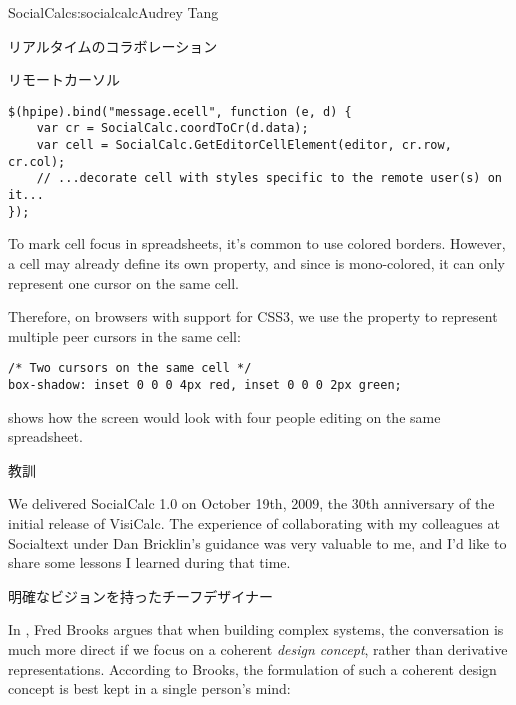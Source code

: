 \begin{aosachapter}{SocialCalc}{s:socialcalc}{Audrey Tang}
\begin{aosasect1}{リアルタイムのコラボレーション}
\begin{aosasect2}{リモートカーソル}
\begin{verbatim}
$(hpipe).bind("message.ecell", function (e, d) {
    var cr = SocialCalc.coordToCr(d.data);
    var cell = SocialCalc.GetEditorCellElement(editor, cr.row, cr.col);
    // ...decorate cell with styles specific to the remote user(s) on it...
});
\end{verbatim}

To mark cell focus in spreadsheets, it's common to use colored
borders.  However, a cell may already define its own 
property, and since  is mono-colored, it can only
represent one cursor on the same cell.

Therefore, on browsers with support for CSS3, we use the 
property to represent multiple peer cursors in the same cell:

\begin{verbatim}
/* Two cursors on the same cell */
box-shadow: inset 0 0 0 4px red, inset 0 0 0 2px green;
\end{verbatim}

 shows how the screen would look with four
people editing on the same spreadsheet.


\end{aosasect2}

\end{aosasect1}

\begin{aosasect1}{教訓}

We delivered SocialCalc 1.0 on October 19th, 2009, the 30th
anniversary of the initial release of VisiCalc.  The experience of
collaborating with my colleagues at Socialtext under Dan Bricklin's
guidance was very valuable to me, and I'd like to share some lessons
I learned during that time.

\begin{aosasect2}{明確なビジョンを持ったチーフデザイナー}

In \cite{bib:brooks:design}, Fred Brooks argues that when building
complex systems, the conversation is much more direct if we focus on a
coherent \emph{design concept}, rather than derivative
representations. According to Brooks, the formulation of such a
coherent design concept is best kept in a single person's mind:


\end{aosasect2}
\end{aosasect1}
\end{aosachapter}
